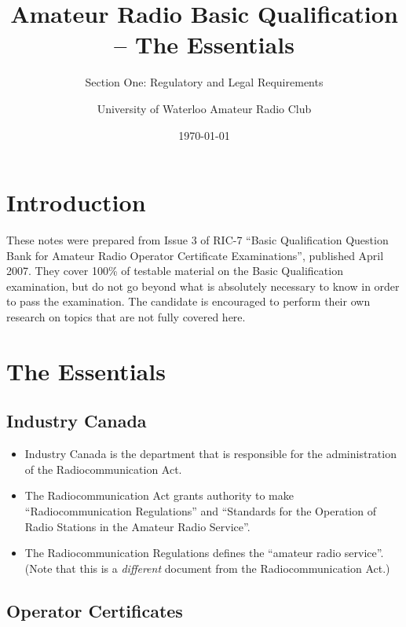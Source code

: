 \documentclass[letterpaper,12pt]{scrartcl}
\title{Amateur Radio Basic Qualification -- The Essentials}
\subtitle{Section One: Regulatory and Legal Requirements}
\author{University of Waterloo Amateur Radio Club}
\date{\today}
\begin{document}
\maketitle
\tableofcontents

\section{Introduction}

These notes were prepared from Issue 3 of RIC-7 ``Basic Qualification Question Bank for Amateur Radio Operator Certificate Examinations'', published April 2007.
They cover 100\% of testable material on the Basic Qualification examination, but do not go beyond what is absolutely necessary to know in order to pass the examination.
The candidate is encouraged to perform their own research on topics that are not fully covered here.

\section{The Essentials}

\subsection{Industry Canada}

\begin{itemize}
\item Industry Canada is the department that is responsible for the administration of the Radiocommunication Act.
\item The Radiocommunication Act grants authority to make ``Radiocommunication Regulations'' and ``Standards
for the Operation of Radio Stations in the Amateur Radio Service''.
\item The Radiocommunication Regulations defines the ``amateur radio service''. (Note that this is a \textit{different} document from the Radiocommunication Act.)
\end{itemize}

\subsection{Operator Certificates}
\end{document}
